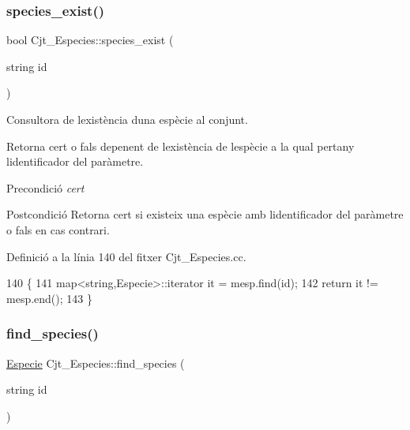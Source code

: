 \subsubsection{\texorpdfstring{species\+\_\+exist()}{species\_exist()}}
{\footnotesize\ttfamily bool Cjt\+\_\+\+Especies\+::species\+\_\+exist (\begin{DoxyParamCaption}\item[{string}]{id }\end{DoxyParamCaption})}



Consultora de l\textquotesingle{}existència d\textquotesingle{}una espècie al conjunt. 

Retorna cert o fals depenent de l\textquotesingle{}existència de l\textquotesingle{}espècie a la qual pertany l\textquotesingle{}identificador del paràmetre.

\begin{DoxyPrecond}{Precondició}
{\itshape cert} 
\end{DoxyPrecond}
\begin{DoxyPostcond}{Postcondició}
Retorna cert si existeix una espècie amb l\textquotesingle{}identificador del paràmetre o fals en cas contrari. 
\end{DoxyPostcond}


Definició a la línia 140 del fitxer Cjt\+\_\+\+Especies.\+cc.


\begin{DoxyCode}
140                                           \{
141     map<string,Especie>::iterator it = mesp.find(\textcolor{keywordtype}{id});
142     \textcolor{keywordflow}{return} it != mesp.end();
143 \}
\end{DoxyCode}
\mbox{\label{class_cjt___especies_a1e01bf8dfbde0983404efba05bd1b4b3}} 
\subsubsection{\texorpdfstring{find\+\_\+species()}{find\_species()}}
{\footnotesize\ttfamily \hyperlink{class_especie}{Especie} Cjt\+\_\+\+Especies\+::find\+\_\+species (\begin{DoxyParamCaption}\item[{string}]{id }\end{DoxyParamCaption})}




